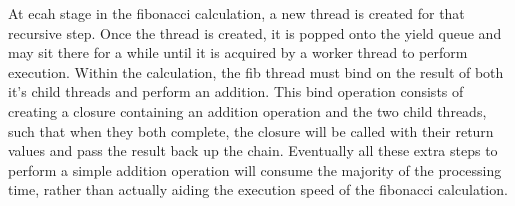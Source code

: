 \documentclass[12pt,twoside,notitlepage]{report}
\begin{document}
%
%
At ecah stage in the fibonacci calculation, a new thread is created for that recursive step. Once the thread is created, it is popped onto the yield queue and may sit there for a while until it is acquired by a worker thread to
perform execution. Within the calculation, the fib thread must bind on the result of both it's child threads and perform an addition. This bind operation consists of creating a closure containing an addition operation and the two
child threads, such that when they both complete, the closure will be called with their return values and pass the result back up the chain. Eventually all these extra steps to perform a simple addition operation will consume the
majority of the processing time, rather than actually aiding the execution speed of the fibonacci calculation. 

% 
\end{document}
